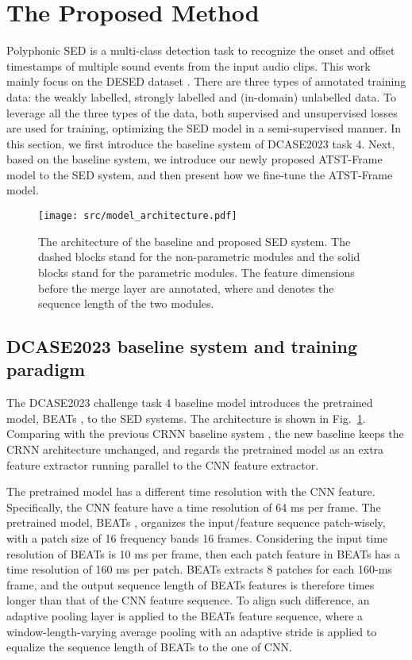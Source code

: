 \documentclass{article}
\begin{document}
\section{The Proposed Method}
\label{sec:method}
Polyphonic SED is a multi-class detection task to recognize the onset and offset timestamps of multiple sound events from the input audio clips. This work mainly focus on the DESED dataset \cite{turpault2019sound}. There are three types of annotated training data: the weakly labelled, strongly labelled and (in-domain) unlabelled data. To leverage all the three types of the data, both supervised and unsupervised losses are used for training, optimizing the SED model in a semi-supervised manner. 
In this section, we first introduce the baseline system of DCASE2023 task 4. Next, based on the baseline system, we introduce our newly proposed ATST-Frame model to the SED system, and then present how we fine-tune the ATST-Frame model.

\begin{figure}[tb]
\begin{minipage}[b]{1.0\linewidth}
  \centering
  \centerline{\texttt{[image: src/model\_architecture.pdf]}}
\end{minipage}
\caption{The architecture of the baseline and proposed SED system. The dashed blocks stand for the non-parametric modules and the solid blocks stand for the parametric modules. The feature dimensions before the merge layer are annotated, where  and  denotes the sequence length of the two modules.}
\label{fig: arch}
\vspace{-1em}
\end{figure}


\subsection{DCASE2023 baseline system and training paradigm}
The DCASE2023 challenge task 4 baseline model introduces the pretrained model, BEATs \cite{Chen2023BEATs}, to the SED systems. The architecture is shown in Fig.~\ref{fig: arch}. Comparing with the previous CRNN baseline system \cite{jiakai2018mean}, the new baseline keeps the CRNN architecture unchanged, and regards the pretrained model as an extra feature extractor running parallel to the CNN feature extractor. 

The pretrained model has a different time resolution with the CNN feature.
Specifically, the CNN feature have a time resolution of 64 ms per frame.
The pretrained model, BEATs \cite{Chen2023BEATs}, organizes the input/feature sequence patch-wisely, with a patch size of 16 frequency bands  16 frames. Considering the input time resolution of BEATs is 10 ms per frame, then each patch feature in BEATs has a time resolution of 160 ms per patch. BEATs extracts 8 patches for each 160-ms frame, and the output sequence length of BEATs features is therefore  times longer than that of the CNN feature sequence. To align such difference, an adaptive pooling layer is applied to the BEATs feature sequence, where a window-length-varying average pooling with an adaptive stride is applied to equalize the sequence length of BEATs to the one of CNN. 
\end{document}
